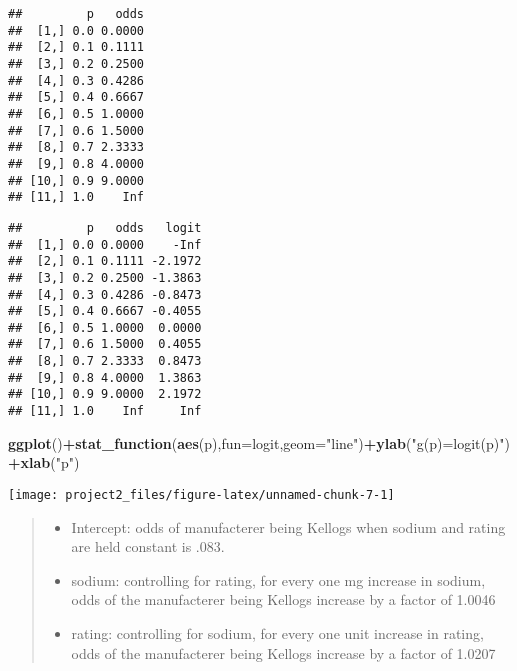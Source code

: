 \documentclass[]{article}
\newenvironment{Shaded}{\begin{snugshade}}{\end{snugshade}}
\newcommand{\ControlFlowTok}[1]{\textcolor[rgb]{0.13,0.29,0.53}{\textbf{#1}}}
\newcommand{\DataTypeTok}[1]{\textcolor[rgb]{0.13,0.29,0.53}{#1}}
\newcommand{\DecValTok}[1]{\textcolor[rgb]{0.00,0.00,0.81}{#1}}
\newcommand{\KeywordTok}[1]{\textcolor[rgb]{0.13,0.29,0.53}{\textbf{#1}}}
\newcommand{\NormalTok}[1]{#1}
\newcommand{\OperatorTok}[1]{\textcolor[rgb]{0.81,0.36,0.00}{\textbf{#1}}}
\newcommand{\StringTok}[1]{\textcolor[rgb]{0.31,0.60,0.02}{#1}}
\providecommand{\tightlist}{%
  \setlength{\itemsep}{0pt}\setlength{\parskip}{0pt}}
\begin{document}
\begin{verbatim}
##         p   odds
##  [1,] 0.0 0.0000
##  [2,] 0.1 0.1111
##  [3,] 0.2 0.2500
##  [4,] 0.3 0.4286
##  [5,] 0.4 0.6667
##  [6,] 0.5 1.0000
##  [7,] 0.6 1.5000
##  [8,] 0.7 2.3333
##  [9,] 0.8 4.0000
## [10,] 0.9 9.0000
## [11,] 1.0    Inf
\end{verbatim}

\begin{Shaded}
\end{Shaded}

\begin{verbatim}
##         p   odds   logit
##  [1,] 0.0 0.0000    -Inf
##  [2,] 0.1 0.1111 -2.1972
##  [3,] 0.2 0.2500 -1.3863
##  [4,] 0.3 0.4286 -0.8473
##  [5,] 0.4 0.6667 -0.4055
##  [6,] 0.5 1.0000  0.0000
##  [7,] 0.6 1.5000  0.4055
##  [8,] 0.7 2.3333  0.8473
##  [9,] 0.8 4.0000  1.3863
## [10,] 0.9 9.0000  2.1972
## [11,] 1.0    Inf     Inf
\end{verbatim}

\begin{Shaded}
\begin{Highlighting}[]
\KeywordTok{ggplot}\NormalTok{()}\OperatorTok{+}\KeywordTok{stat_function}\NormalTok{(}\KeywordTok{aes}\NormalTok{(p),}\DataTypeTok{fun=}\NormalTok{logit,}\DataTypeTok{geom=}\StringTok{"line"}\NormalTok{)}\OperatorTok{+}\KeywordTok{ylab}\NormalTok{(}\StringTok{"g(p)=logit(p)"}\NormalTok{)}\OperatorTok{+}\KeywordTok{xlab}\NormalTok{(}\StringTok{"p"}\NormalTok{)}
\end{Highlighting}
\end{Shaded}

\begin{center}\texttt{[image: project2\_files/figure-latex/unnamed-chunk-7-1]} \end{center}

\begin{quote}
\begin{itemize}
\tightlist
\item
  Intercept: odds of manufacterer being Kellogs when sodium and rating
  are held constant is .083.
\item
  sodium: controlling for rating, for every one mg increase in sodium,
  odds of the manufacterer being Kellogs increase by a factor of 1.0046
\item
  rating: controlling for sodium, for every one unit increase in rating,
  odds of the manufacterer being Kellogs increase by a factor of 1.0207
\end{itemize}
\end{quote}
\end{document}
